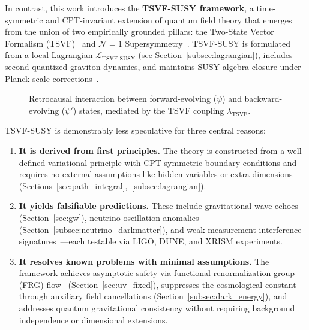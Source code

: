 \documentclass[twocolumn,superscriptaddress,floatfix]{revtex4-2}
\begin{document}
In contrast, this work introduces the \textbf{TSVF-SUSY framework}, a time-symmetric and CPT-invariant extension of quantum field theory that emerges from the union of two empirically grounded pillars: the Two-State Vector Formalism (TSVF)~\cite{Aharonov2008} and $\mathcal{N}=1$ Supersymmetry~\cite{Wess1992}. TSVF-SUSY is formulated from a local Lagrangian $\mathcal{L}_{\text{TSVF-SUSY}}$ (see Section~\ref{subsec:lagrangian}), includes second-quantized graviton dynamics, and maintains SUSY algebra closure under Planck-scale corrections~\cite{Ferrara1974}.

\begin{figure}[htbp]
\centering
{}
\caption{Retrocausal interaction between forward-evolving (\(\psi\)) and backward-evolving (\(\psi'\)) states, mediated by the TSVF coupling \(\lambda_{\text{TSVF}}\).}
\label{fig:retrocausal}
\end{figure}

TSVF-SUSY is demonstrably less speculative for three central reasons:
\begin{enumerate}
  \item \textbf{It is derived from first principles.} The theory is constructed from a well-defined variational principle with CPT-symmetric boundary conditions and requires no external assumptions like hidden variables or extra dimensions (Sections~\ref{sec:path_integral},~\ref{subsec:lagrangian}).
  \item \textbf{It yields falsifiable predictions.} These include gravitational wave echoes~\cite{Abedi2017,tsvf-susy-gw} (Section~\ref{sec:gw}), neutrino oscillation anomalies~\cite{T2K2019,tsvf-susy-neutrinos} (Section~\ref{subsec:neutrino_darkmatter}), and weak measurement interference signatures~\cite{Danan2013,tsvf-susy-weak}—each testable via LIGO, DUNE, and XRISM experiments.
  \item \textbf{It resolves known problems with minimal assumptions.} The framework achieves asymptotic safety via functional renormalization group (FRG) flow~\cite{Reuter1998} (Section~\ref{sec:uv_fixed}), suppresses the cosmological constant through auxiliary field cancellations (Section~\ref{subsec:dark_energy}), and addresses quantum gravitational consistency without requiring background independence or dimensional extensions.
\end{enumerate}
\end{document}
